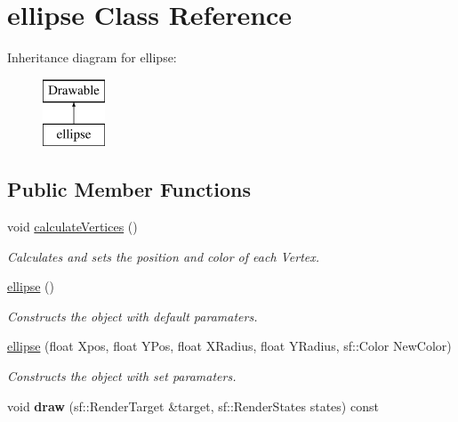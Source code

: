\hypertarget{classellipse}{}\section{ellipse Class Reference}
\label{classellipse}
Inheritance diagram for ellipse\+:\begin{figure}[H]
\begin{center}
\leavevmode
\includegraphics[height=2.000000cm]{classellipse}
\end{center}
\end{figure}
\subsection*{Public Member Functions}
\begin{DoxyCompactItemize}
\item 
\mbox{\label{classellipse_a59c2f682625538eb3f5ec106d9755f8f}} 
void \mbox{\hyperlink{classellipse_a59c2f682625538eb3f5ec106d9755f8f}{calculate\+Vertices}} ()
\begin{DoxyCompactList}\small\item\em Calculates and sets the position and color of each Vertex. \end{DoxyCompactList}\item 
\mbox{\label{classellipse_a4176fad8b9a976e08817c56cbefdffc7}} 
\mbox{\hyperlink{classellipse_a4176fad8b9a976e08817c56cbefdffc7}{ellipse}} ()
\begin{DoxyCompactList}\small\item\em Constructs the object with default paramaters. \end{DoxyCompactList}\item 
\mbox{\hyperlink{classellipse_a7eabcab8be3f231227197c61b3f86af7}{ellipse}} (float Xpos, float Y\+Pos, float X\+Radius, float Y\+Radius, sf\+::\+Color New\+Color)
\begin{DoxyCompactList}\small\item\em Constructs the object with set paramaters. \end{DoxyCompactList}\item 
\mbox{\label{classellipse_ad28e53a614a981a5937edb65a05e4e38}} 
void {\bfseries draw} (sf\+::\+Render\+Target \&target, sf\+::\+Render\+States states) const
\end{DoxyCompactItemize}


